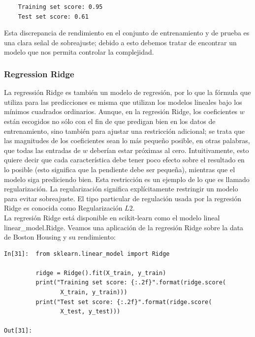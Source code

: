{\begin{lstlisting}
    Training set score: 0.95
    Test set score: 0.61

\end{lstlisting}

Esta discrepancia de rendimiento en el conjunto de entrenamiento y  de prueba es una clara señal de sobreajuste; debido a esto debemos tratar de encontrar un modelo que nos permita controlar la complejidad. 


\subsubsection{Regression Ridge}


La regressión  Ridge es también un modelo de regresión,   por lo que la fórmula que  utiliza para las predicciones es misma que utilizan los modelos lineales bajo los mínimos cuadrados ordinarios. 
Aunque, en la regresión Ridge, los coeficientes $w$ están escogidos no sólo con el fin de que predigan bien en los datos de entrenamiento, sino  también para ajustar una restricción adicional; se trata que las magnitudes de los coeficientes sean lo más pequeño posible, en otras palabras, que todas las entradas de $w $ deberían estar próximas al cero.   Intuitivamente, esto quiere decir que cada característica debe tener poco efecto sobre el resultado en lo posible (esto significa que la pendiente debe ser pequeña), mientras  que el modelo siga prediciendo bien.  Esta restricción es un ejemplo de lo que es llamado regularización. La regularización significa explícitamente restringir un modelo para evitar sobreajuste. El tipo  particular de regulación usada  por la regresión Ridge es conocida como Regularización  $L2$. \\

 La regresión Ridge está disponible  en  {\ttfamily scikit-learn}  como el modelo lineal  {\ttfamily linear\_model.Ridge}.   Veamos una aplicación de la regresión Ridge  sobre la data de Boston Housing y su rendimiento:\\


\begin{lstlisting}
In[31]:  from sklearn.linear_model import Ridge

         ridge = Ridge().fit(X_train, y_train)
         print("Training set score: {:.2f}".format(ridge.score(
                X_train, y_train)))
         print("Test set score: {:.2f}".format(ridge.score(
                X_test, y_test)))

Out[31]:
    

\end{lstlisting}}
